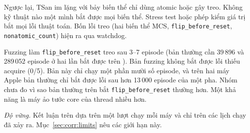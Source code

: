 Ngược lại, TSan im lặng với bảy biến thể chỉ dùng atomic hoặc gây treo. Không kỹ thuật nào một mình
bắt được mọi biến thể. Stress test hoặc phép kiểm giá trị bắt mọi lỗi thuật toán. Bốn lỗi treo (hai biến
thể MCS, \texttt{flip\_before\_reset}, \texttt{nonatomic\_count}) hiện ra qua watchdog.

Fuzzing làm \texttt{flip\_before\_reset} treo sau 3--7 episode (bản thường cần 39\,896 và 289\,052
episode ở hai lần bắt được trên ). Bản fuzzing không bắt được lỗi thiếu acquire (0/5).
Bản này chỉ chạy một phần mười số episode, và trên hai máy Apple bản thường chỉ bắt được lỗi sau hơn
13\,000 episode của một pha. Nhóm chưa đo vì sao bản thường trên  bắt
\texttt{flip\_before\_reset} thường hơn. Một khả năng là máy ảo tước core của thread nhiều hơn.

\emph{Độ vững.} Kết luận trên dựa trên một lượt chạy mỗi máy và chỉ trên các lịch chạy đã xảy ra.
Mục~\ref{sec:corr:limits} nêu các giới hạn này.
